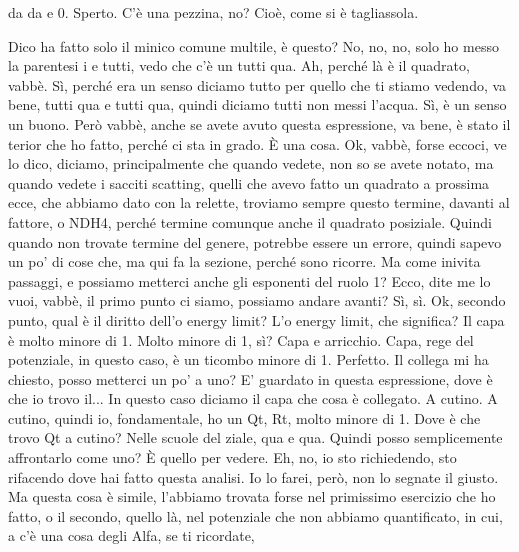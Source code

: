 \begin{soluzione}
{da da e 0. Sperto. C'è una pezzina, no? Cioè, come si è tagliassola. 
   
   
   Dico ha fatto solo il minico comune multile, è questo? No, no, no, solo ho messo la parentesi i e tutti, vedo che c'è un tutti qua. Ah, perché là è il quadrato, vabbè. Sì, perché era un senso diciamo tutto per quello che ti stiamo vedendo, va bene, tutti qua e tutti qua, quindi diciamo tutti non messi l'acqua. Sì, è un senso un buono. Però vabbè, anche se avete avuto questa espressione, va bene, è stato il terior che ho fatto, perché ci sta in grado. È una cosa. Ok, vabbè, forse eccoci, ve lo dico, diciamo, principalmente che quando vedete, non so se avete notato, ma quando vedete i sacciti scatting, quelli che avevo fatto un quadrato a prossima ecce, che abbiamo dato con la relette, troviamo sempre questo termine, davanti al fattore, o NDH4, perché termine comunque anche il quadrato posiziale. Quindi quando non trovate termine del genere, potrebbe essere un errore, quindi sapevo un po' di cose che, ma qui fa la sezione, perché sono ricorre. Ma come inivita passaggi, e possiamo metterci anche gli esponenti del ruolo 1? Ecco, dite me lo vuoi, vabbè, il primo punto ci siamo, possiamo andare avanti? Sì, sì. Ok, secondo punto, qual è il diritto dell'o energy limit? L'o energy limit, che significa? Il capa è molto minore di 1. Molto minore di 1, sì? Capa e arricchio. Capa, rege del potenziale, in questo caso, è un ticombo minore di 1. Perfetto. Il collega mi ha chiesto, posso metterci un po' a uno? E' guardato in questa espressione, dove è che io trovo il... In questo caso diciamo il capa che cosa è collegato. A cutino. A cutino, quindi io, fondamentale, ho un Qt, Rt, molto minore di 1. Dove è che trovo Qt a cutino? Nelle scuole del ziale, qua e qua. Quindi posso semplicemente affrontarlo come uno? È quello per vedere. Eh, no, io sto richiedendo, sto rifacendo dove hai fatto questa analisi. Io lo farei, però, non lo segnate il giusto. Ma questa cosa è simile, l'abbiamo trovata forse nel primissimo esercizio che ho fatto, o il secondo, quello là, nel potenziale che non abbiamo quantificato, in cui, a c'è una cosa degli Alfa, se ti ricordate, 
   
}
\end{soluzione}
